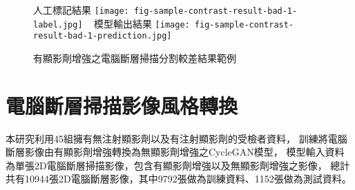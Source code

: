 \documentclass[class=NCU_thesis, crop=false]{standalone}
\begin{document}
\begin{figure}[!hbt]
    \centering
    \subcaptionbox
        {人工標記結果
        \label{fig:fig-sample-contrast-result-bad-1-label}}
        {\texttt{[image: fig-sample-contrast-result-bad-1-label.jpg]}}
    ~
    \subcaptionbox
        {模型輸出結果
        \label{fig:fig-sample-contrast-result-bad-1-prediction}}
        {\texttt{[image: fig-sample-contrast-result-bad-1-prediction.jpg]}}
    \caption{有顯影劑增強之電腦斷層掃描分割較差結果範例}
    \label{fig:fig-sample-contrast-result-bad-1}
\end{figure}
% 
% 

\section{電腦斷層掃描影像風格轉換}
本研究利用45組擁有無注射顯影劑以及有注射顯影劑的受檢者資料，
訓練將電腦斷層影像由有顯影劑增強轉換為無顯影劑增強之CycleGAN模型，
模型輸入資料為單張2D電腦斷層掃描影像，包含有顯影劑增強以及無顯影劑增強之影像，
總計共有10944張2D電腦斷層影像，其中9792張做為訓練資料、1152張做為測試資料。
\end{document}
